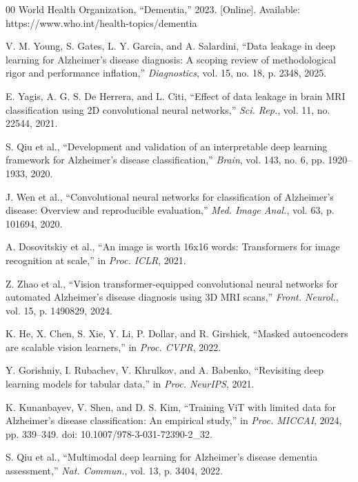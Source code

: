 \documentclass[conference]{IEEEtran}
\begin{document}
\begin{thebibliography}{00}
 World Health Organization, ``Dementia,'' 2023. [Online]. Available: https://www.who.int/health-topics/dementia

 V. M. Young, S. Gates, L. Y. Garcia, and A. Salardini, ``Data leakage in deep learning for Alzheimer's disease diagnosis: A scoping review of methodological rigor and performance inflation,'' \textit{Diagnostics}, vol. 15, no. 18, p. 2348, 2025.

 E. Yagis, A. G. S. De Herrera, and L. Citi, ``Effect of data leakage in brain MRI classification using 2D convolutional neural networks,'' \textit{Sci. Rep.}, vol. 11, no. 22544, 2021.

 S. Qiu et al., ``Development and validation of an interpretable deep learning framework for Alzheimer's disease classification,'' \textit{Brain}, vol. 143, no. 6, pp. 1920--1933, 2020.

 J. Wen et al., ``Convolutional neural networks for classification of Alzheimer's disease: Overview and reproducible evaluation,'' \textit{Med. Image Anal.}, vol. 63, p. 101694, 2020.

 A. Dosovitskiy et al., ``An image is worth 16x16 words: Transformers for image recognition at scale,'' in \textit{Proc. ICLR}, 2021.

 Z. Zhao et al., ``Vision transformer-equipped convolutional neural networks for automated Alzheimer's disease diagnosis using 3D MRI scans,'' \textit{Front. Neurol.}, vol. 15, p. 1490829, 2024.

 K. He, X. Chen, S. Xie, Y. Li, P. Dollar, and R. Girshick, ``Masked autoencoders are scalable vision learners,'' in \textit{Proc. CVPR}, 2022.

 Y. Gorishniy, I. Rubachev, V. Khrulkov, and A. Babenko, ``Revisiting deep learning models for tabular data,'' in \textit{Proc. NeurIPS}, 2021.

 K. Kunanbayev, V. Shen, and D. S. Kim, ``Training ViT with limited data for Alzheimer's disease classification: An empirical study,'' in \textit{Proc. MICCAI}, 2024, pp. 339--349. doi: 10.1007/978-3-031-72390-2\_32.

 S. Qiu et al., ``Multimodal deep learning for Alzheimer's disease dementia assessment,'' \textit{Nat. Commun.}, vol. 13, p. 3404, 2022.


\end{thebibliography}
\end{document}
